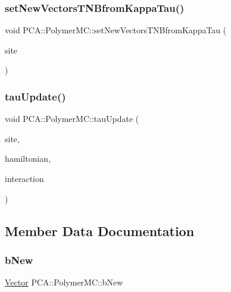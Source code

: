 \subsubsection{\texorpdfstring{set\+New\+Vectors\+T\+N\+Bfrom\+Kappa\+Tau()}{setNewVectorsTNBfromKappaTau()}}
{\footnotesize\ttfamily void P\+C\+A\+::\+Polymer\+M\+C\+::set\+New\+Vectors\+T\+N\+Bfrom\+Kappa\+Tau (\begin{DoxyParamCaption}\item[{int}]{site }\end{DoxyParamCaption})}

\hypertarget{class_p_c_a_1_1_polymer_m_c_aa5f0b2a0c75a6e01505afe1a600cf59e}{}\label{class_p_c_a_1_1_polymer_m_c_aa5f0b2a0c75a6e01505afe1a600cf59e} 
\subsubsection{\texorpdfstring{tau\+Update()}{tauUpdate()}}
{\footnotesize\ttfamily void P\+C\+A\+::\+Polymer\+M\+C\+::tau\+Update (\begin{DoxyParamCaption}\item[{int}]{site,  }\item[{const \hyperlink{class_p_c_a_1_1_hamiltonian}{Hamiltonian} \&}]{hamiltonian,  }\item[{const \hyperlink{class_p_c_a_1_1_lennard_jones}{Lennard\+Jones} \&}]{interaction }\end{DoxyParamCaption})}



\subsection{Member Data Documentation}
\hypertarget{class_p_c_a_1_1_polymer_m_c_a69019643d3a1fd92b8c77647bb4a91d6}{}\label{class_p_c_a_1_1_polymer_m_c_a69019643d3a1fd92b8c77647bb4a91d6} 
\subsubsection{\texorpdfstring{b\+New}{bNew}}
{\footnotesize\ttfamily \hyperlink{class_p_c_a_1_1_vector}{Vector} P\+C\+A\+::\+Polymer\+M\+C\+::b\+New\hspace{0.3cm}{\ttfamily [private]}}


